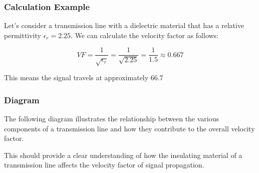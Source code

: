 \subsubsection{Calculation Example}
Let’s consider a transmission line with a dielectric material that has a relative permittivity \( \epsilon_r = 2.25 \). We can calculate the velocity factor as follows:

\[
VF = \frac{1}{\sqrt{\epsilon_r}} = \frac{1}{\sqrt{2.25}} = \frac{1}{1.5} \approx 0.667
\]

This means the signal travels at approximately 66.7%

\subsubsection{Diagram}
The following diagram illustrates the relationship between the various components of a transmission line and how they contribute to the overall velocity factor.


This should provide a clear understanding of how the insulating material of a transmission line affects the velocity factor of signal propagation.